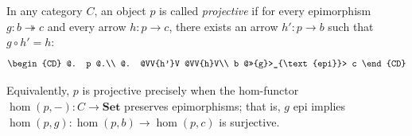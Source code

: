In any category $C$, an object $p$ is called \textit{projective} if for every epimorphism $g : b \twoheadrightarrow c$ and every arrow $h : p \rightarrow c$, there exists an arrow $h' : p \rightarrow b$ such that $g \circ h' = h$:
\[
\begin{CD}
@. p @.\\
@. @VV{h'}V @VV{h}V\\
b @>>{g}>_{\text{epi}}> c
\end{CD}
\]

Equivalently, $p$ is projective precisely when the hom-functor $\hom(p, -) : C \rightarrow \mathbf{Set}$ preserves epimorphisms; that is, $g$ epi implies $\hom(p, g) : \hom(p, b) \rightarrow \hom(p, c)$ is surjective.
